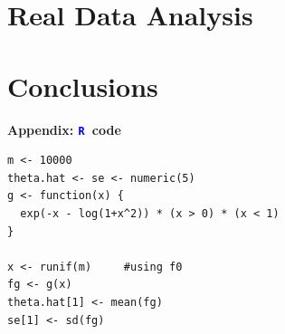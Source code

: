 \documentclass[12pt]{article}
\newcommand{\textR}[1]{\textcolor{blue}{\texttt{#1}}}
\newcommand{\R}{\textR{R}}
\begin{document}
\section{Real Data Analysis}


\section{Conclusions}

 
\newpage






\newpage

\appendix

\begin{center}
{\Large {\bf Appendix: \R\ code}}
\end{center}

{\footnotesize \begin{verbatim}
m <- 10000 
theta.hat <- se <- numeric(5)
g <- function(x) {
  exp(-x - log(1+x^2)) * (x > 0) * (x < 1)
}

x <- runif(m)     #using f0
fg <- g(x)
theta.hat[1] <- mean(fg)
se[1] <- sd(fg)
\end{verbatim} }
\end{document}
